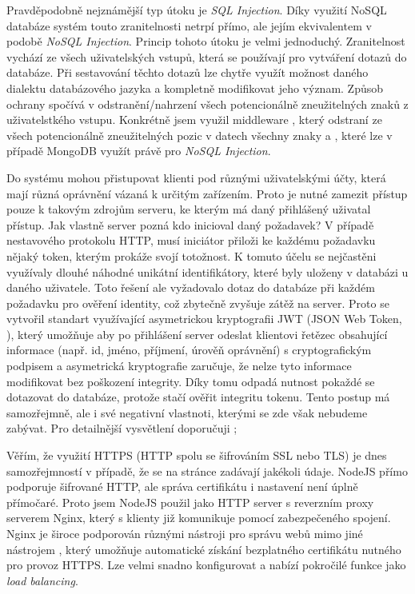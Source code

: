 Pravděpodobně nejznámější typ útoku je \textit{SQL Injection}. Díky využití NoSQL databáze systém touto zranitelnosti netrpí přímo, ale jejím ekvivalentem v podobě \textit{NoSQL Injection}. Princip tohoto útoku je velmi jednoduchý. Zranitelnost vychází ze všech uživatelských vstupů, která se používají pro vytváření dotazů do databáze. Při sestavování těchto dotazů lze chytře využít možnost daného dialektu databázového jazyka a kompletně modifikovat jeho význam. Způsob ochrany spočívá v odstranění/nahrzení všech potencionálně zneužitelných znaků z uživatelstkého vstupu. Konkrétně jsem využil middleware , který odstraní ze všech potencionálně zneužitelných pozic v datech všechny znaky \uv{\$} a , které lze v případě MongoDB využít právě pro \textit{NoSQL Injection}.

Do systému mohou přistupovat klienti pod různými uživatelskými účty, která mají různá oprávnění vázaná k určitým zařízením. Proto je nutné zamezit přístup pouze k takovým zdrojům serveru, ke kterým má daný přihlášený uživatal přístup. Jak vlastně server pozná kdo inicioval daný požadavek? V případě nestavového protokolu HTTP, musí iniciátor přiloži ke každému požadavku nějaký token, kterým prokáže svojí totožnost. K tomuto účelu se nejčastěni využívaly dlouhé náhodné unikátní identifikátory, které byly uloženy v databázi u daného uživatele. Toto řešení ale vyžadovalo dotaz do databáze při každém požadavku pro ověření identity, což zbytečně zvyšuje zátěž na server. Proto se vytvořil standart využívající asymetrickou kryptografii JWT (JSON Web Token, \cite[RFC 7519]{rfc-jwt}), který umožňuje aby po přihlášení server odeslat klientovi řetězec obsahující informace (např. id, jméno, příjmení, úrověň oprávnění) s cryptografickým podpisem a asymetrická kryptografie zaručuje, že nelze tyto informace modifikovat bez poškození integrity. Díky tomu odpadá nutnost pokaždé se dotazovat do databáze, protože stačí ověřit integritu tokenu. Tento postup má samozřejmně, ale i své negativní vlastnoti, kterými se zde však nebudeme zabývat. Pro detailnější vysvětlení doporučuji \cite{jwt-cons};

Věřím, že využití HTTPS (HTTP spolu se šifrováním SSL nebo TLS) je dnes samozřejmností v případě, že se na stránce zadávají jakékoli údaje. NodeJS přímo podporuje šifrované HTTP, ale správa certifikátu i nastavení není úplně přímočaré. Proto jsem NodeJS použil jako HTTP server s reverzním proxy serverem Nginx, který s klienty již komunikuje pomocí zabezpečeného spojení. Nginx je široce podporován různými nástroji pro správu webů mimo jiné nástrojem , který umožňuje automatické získání bezplatného certifikátu nutného pro provoz HTTPS. Lze velmi snadno konfigurovat a nabízí pokročilé funkce jako \textit{load balancing}.

